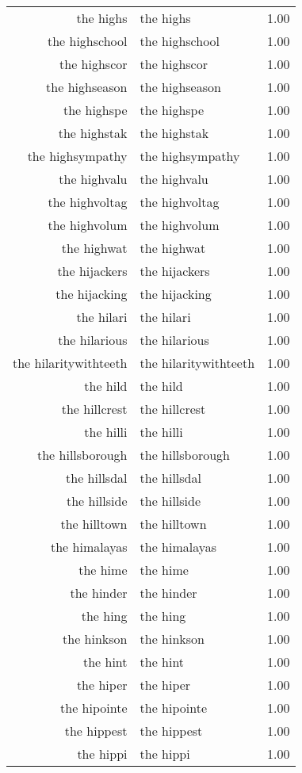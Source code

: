 \begin{table}[ht]
\begin{tabular}{rlr}
  the highs & the highs & 1.00 \\ 
  the highschool & the highschool & 1.00 \\ 
  the highscor & the highscor & 1.00 \\ 
  the highseason & the highseason & 1.00 \\ 
  the highspe & the highspe & 1.00 \\ 
  the highstak & the highstak & 1.00 \\ 
  the highsympathy & the highsympathy & 1.00 \\ 
  the highvalu & the highvalu & 1.00 \\ 
  the highvoltag & the highvoltag & 1.00 \\ 
  the highvolum & the highvolum & 1.00 \\ 
  the highwat & the highwat & 1.00 \\ 
  the hijackers & the hijackers & 1.00 \\ 
  the hijacking & the hijacking & 1.00 \\ 
  the hilari & the hilari & 1.00 \\ 
  the hilarious & the hilarious & 1.00 \\ 
  the hilaritywithteeth & the hilaritywithteeth & 1.00 \\ 
  the hild & the hild & 1.00 \\ 
  the hillcrest & the hillcrest & 1.00 \\ 
  the hilli & the hilli & 1.00 \\ 
  the hillsborough & the hillsborough & 1.00 \\ 
  the hillsdal & the hillsdal & 1.00 \\ 
  the hillside & the hillside & 1.00 \\ 
  the hilltown & the hilltown & 1.00 \\ 
  the himalayas & the himalayas & 1.00 \\ 
  the hime & the hime & 1.00 \\ 
  the hinder & the hinder & 1.00 \\ 
  the hing & the hing & 1.00 \\ 
  the hinkson & the hinkson & 1.00 \\ 
  the hint & the hint & 1.00 \\ 
  the hiper & the hiper & 1.00 \\ 
  the hipointe & the hipointe & 1.00 \\ 
  the hippest & the hippest & 1.00 \\ 
  the hippi & the hippi & 1.00 \\ 

\end{tabular}
\end{table}
